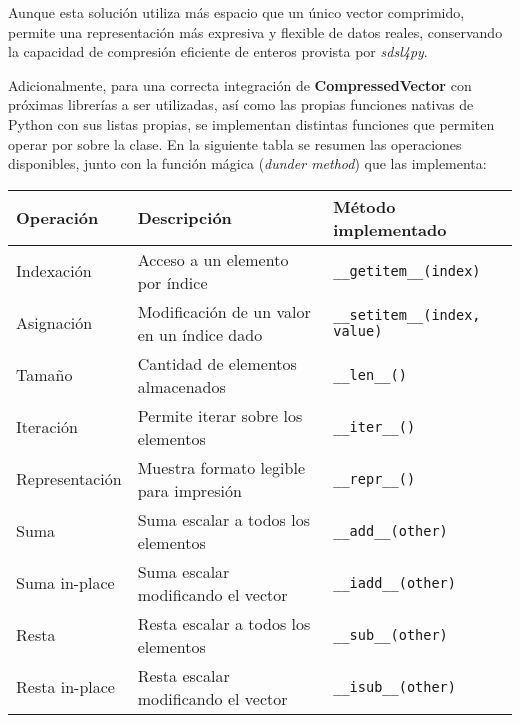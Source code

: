 \vspace{1em}
\noindent
Aunque esta solución utiliza más espacio que un único vector comprimido, permite una representación más expresiva y flexible de datos reales, conservando la capacidad de compresión eficiente de enteros provista por \textit{sdsl4py}.

Adicionalmente, para una correcta integración de \textbf{CompressedVector} con próximas librerías a ser utilizadas, así como las propias funciones nativas de Python con sus listas propias, se implementan distintas funciones que permiten operar por sobre la clase. En la siguiente tabla se resumen las operaciones disponibles, junto con la función mágica (\textit{dunder method}) que las implementa:


\begin{table}[H]
\centering
\renewcommand{\arraystretch}{1.3} %
\begin{tabular}{|p{3.5cm}|p{6cm}|p{5cm}|}
\hline
\textbf{Operación} & \textbf{Descripción} & \textbf{Método implementado} \\
\hline
\rule{0pt}{1.5em}Indexación         & Acceso a un elemento por índice                & \texttt{\_\_getitem\_\_(index)} \\
\hline
\rule{0pt}{1.5em}Asignación         & Modificación de un valor en un índice dado     & \texttt{\_\_setitem\_\_(index, value)} \\
\hline
\rule{0pt}{1.5em}Tamaño             & Cantidad de elementos almacenados              & \texttt{\_\_len\_\_()} \\
\hline
\rule{0pt}{1.5em}Iteración          & Permite iterar sobre los elementos             & \texttt{\_\_iter\_\_()} \\
\hline
\rule{0pt}{1.5em}Representación     & Muestra formato legible para impresión         & \texttt{\_\_repr\_\_()} \\
\hline
\rule{0pt}{1.5em}Suma               & Suma escalar a todos los elementos             & \texttt{\_\_add\_\_(other)} \\
\hline
\rule{0pt}{1.5em}Suma in-place      & Suma escalar modificando el vector             & \texttt{\_\_iadd\_\_(other)} \\
\hline
\rule{0pt}{1.5em}Resta              & Resta escalar a todos los elementos            & \texttt{\_\_sub\_\_(other)} \\
\hline
\rule{0pt}{1.5em}Resta in-place     & Resta escalar modificando el vector            & \texttt{\_\_isub\_\_(other)} \\

\end{tabular}
\end{table}
